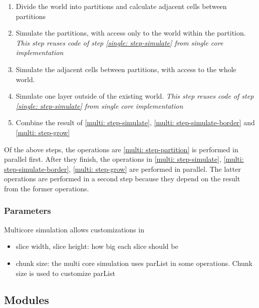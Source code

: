 \documentclass{article}
\newcommand{\code}[1]{{\ttfamily #1}}
\begin{document}
      \begin{enumerate}
        \item \label{multi: step-partition}
        Divide the world into partitions and calculate adjacent cells
        between partitions
        \item \label{multi: step-simulate}
        Simulate the partitions, with access only to the world within the
        partition. \emph{This step reuses code of step \ref{single: step-simulate} from
        single core implementation}
        \item \label{multi: step-simulate-border}
        Simulate the adjacent cells between partitions, with access to the
        whole world.
        \item \label{multi: step-grow}
        Simulate one layer outside of the existing world. \emph{This step reuses
        code of step \ref{single: step-simulate} from single core implementation}
        \item Combine the result of \ref{multi: step-simulate},
        \ref{multi: step-simulate-border} and \ref{multi: step-grow}
      \end{enumerate}

      Of the above steps, the operations are \ref{multi: step-partition}
      is performed in parallel first. After they finish, the operations in
      \ref{multi: step-simulate}, \ref{multi: step-simulate-border},
      \ref{multi: step-grow} are performed in parallel. The latter operations
      are performed in a second step because they depend on the result from
      the former operations.

      \subsubsection{Parameters}

        Multicore simulation allows customizations in

        \begin{itemize}
          \item slice width, slice height: how big each slice should be
          \item chunk size: the multi core simulation uses \code{parList} in
          some operations. Chunk size is used to customize \code{parList}
        \end{itemize}

    \subsection{Modules}
\end{document}
